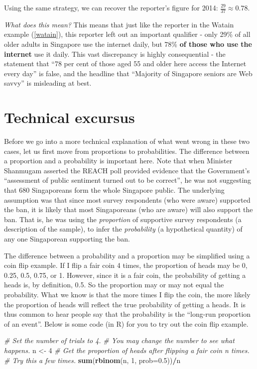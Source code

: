 \documentclass[openany]{book}
\newenvironment{Shaded}{\begin{snugshade}}{\end{snugshade}}
\newcommand{\KeywordTok}[1]{\textcolor[rgb]{0.13,0.29,0.53}{\textbf{#1}}}
\newcommand{\DataTypeTok}[1]{\textcolor[rgb]{0.13,0.29,0.53}{#1}}
\newcommand{\DecValTok}[1]{\textcolor[rgb]{0.00,0.00,0.81}{#1}}
\newcommand{\FloatTok}[1]{\textcolor[rgb]{0.00,0.00,0.81}{#1}}
\newcommand{\StringTok}[1]{\textcolor[rgb]{0.31,0.60,0.02}{#1}}
\newcommand{\CommentTok}[1]{\textcolor[rgb]{0.56,0.35,0.01}{\textit{#1}}}
\newcommand{\OperatorTok}[1]{\textcolor[rgb]{0.81,0.36,0.00}{\textbf{#1}}}
\newcommand{\NormalTok}[1]{#1}
\begin{document}
Using the same strategy, we can recover the reporter's figure for 2014:
\(\frac{29}{37} \approx 0.78\).

\emph{What does this mean?} This means that just like the reporter in
the Watain example (\ref{watain}), this reporter left out an important
qualifier - only 29\% of all older adults in Singapore use the internet
daily, but 78\% \textbf{of those who use the internet} use it daily.
This vast discrepancy is highly consequential - the statement that ``78
per cent of those aged 55 and older here access the Internet every day''
is false, and the headline that ``Majority of Singapore seniors are Web
savvy'' is misleading at best.

\section{Technical excursus}\label{ooptech}

Before we go into a more technical explanation of what went wrong in
these two cases, let us first move from proportions to probabilities.
The difference between a proportion and a probability is important here.
Note that when Minister Shanmugam asserted the REACH poll provided
evidence that the Government's ``assessment of public sentiment turned
out to be correct'', he was not suggesting that 680 Singaporeans form
the whole Singapore public. The underlying assumption was that since
most survey respondents (who were aware) supported the ban, it is likely
that most Singaporeans (who are aware) will also support the ban. That
is, he was using the \emph{proportion} of supportive survey respondents
(a description of the sample), to infer the \emph{probability} (a
hypothetical quantity) of any one Singaporean supporting the ban.

The difference between a probability and a proportion may be simplified
using a coin flip example. If I flip a fair coin 4 times, the proportion
of heads may be 0, 0.25, 0.5, 0.75, or 1. However, since it is a fair
coin, the probability of getting a heads is, by definition, 0.5. So the
proportion may or may not equal the probability. What we know is that
the more times I flip the coin, the more likely the proportion of heads
will reflect the true probability of getting a heads. It is thus common
to hear people say that the probability is the ``long-run proportion of
an event''. Below is some code (in R) for you to try out the coin flip
example.

\begin{Shaded}
\begin{Highlighting}[]
\CommentTok{# Set the number of trials to 4. }
\CommentTok{# You may change the number to see what happens.}
\NormalTok{n <-}\StringTok{ }\DecValTok{4} 
\CommentTok{# Get the proportion of heads after flipping a fair coin n times. }
\CommentTok{# Try this a few times.}
\KeywordTok{sum}\NormalTok{(}\KeywordTok{rbinom}\NormalTok{(n, }\DecValTok{1}\NormalTok{, }\DataTypeTok{prob=}\FloatTok{0.5}\NormalTok{))}\OperatorTok{/}\NormalTok{n }
\end{Highlighting}
\end{Shaded}
\end{document}
